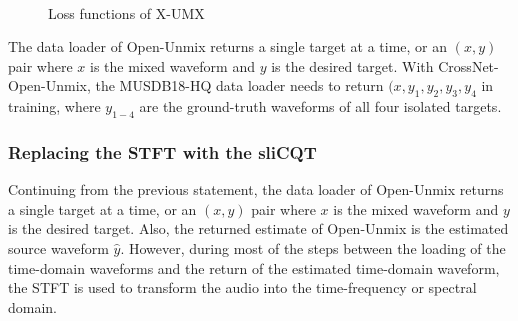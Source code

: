 \documentclass[report.tex]{subfiles}
\begin{document}
\begin{figure}[ht]
	\centering
	\\
	\caption{Loss functions of X-UMX \parencite[2]{xumx}}
	\label{fig:xumxlosses}
\end{figure}

The data loader of Open-Unmix returns a single target at a time, or an $(x, y)$ pair where $x$ is the mixed waveform and $y$ is the desired target. With CrossNet-Open-Unmix, the MUSDB18-HQ data loader needs to return $(x, y_{1}, y_{2}, y_{3}, y_{4}$ in training, where $y_{1-4}$ are the ground-truth waveforms of all four isolated targets.

\newpagefill

\subsubsection{Replacing the STFT with the sliCQT}
\label{sec:replacestft}

Continuing from the previous statement, the data loader of Open-Unmix returns a single target at a time, or an $(x, y)$ pair where $x$ is the mixed waveform and $y$ is the desired target. Also, the returned estimate of Open-Unmix is the estimated source waveform $\hat{y}$. However, during most of the steps between the loading of the time-domain waveforms and the return of the estimated time-domain waveform, the STFT is used to transform the audio into the time-frequency or spectral domain.
\end{document}
